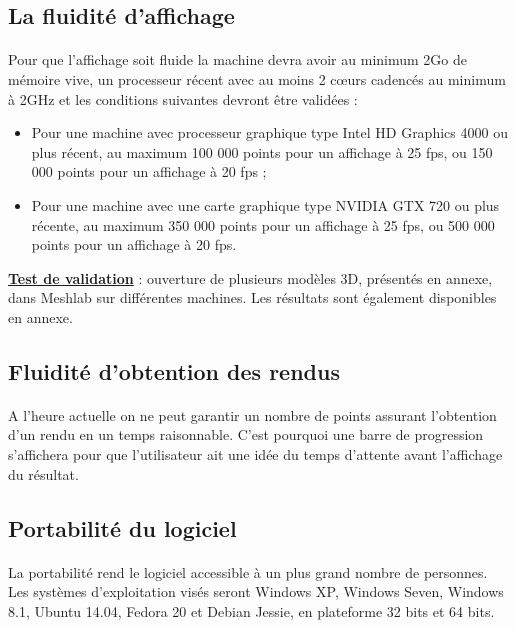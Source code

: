 \subsection{La fluidité d'affichage}
\paragraph{}
	Pour que l’affichage soit fluide la machine devra avoir au minimum 2Go de mémoire vive, un processeur récent avec au moins 2 cœurs cadencés au minimum à 2GHz et les conditions suivantes devront être validées :

	\begin{itemize}
		\item 
		Pour une machine avec processeur graphique type Intel HD Graphics 4000 ou plus récent, au maximum 100 000 points pour un affichage à 25 fps, ou 150 000 points pour un affichage à 20 fps ;
		\item
		Pour une machine avec une carte graphique type NVIDIA GTX 720 ou plus récente, au maximum 350 000 points pour un affichage à 25 fps, ou 500 000 points pour un affichage à 20 fps.
		
	\end{itemize}
	
\textbf{\underline{Test de validation}} : ouverture de plusieurs modèles 3D, présentés en annexe, dans Meshlab sur différentes machines. Les résultats sont également disponibles en annexe.

\subsection{Fluidité d'obtention des rendus}
\paragraph{}
	A l’heure actuelle on ne peut garantir un nombre de points assurant l’obtention d’un rendu en un temps raisonnable. C’est pourquoi une barre de progression s’affichera pour que l’utilisateur ait une idée du temps d’attente avant l’affichage du résultat.

\subsection{Portabilité du logiciel}
\paragraph{}
La portabilité rend le logiciel accessible à un plus grand nombre de personnes. Les systèmes d’exploitation visés seront Windows XP, Windows Seven, Windows 8.1, Ubuntu 14.04, Fedora 20 et Debian Jessie, en plateforme 32 bits et 64 bits. \newline


